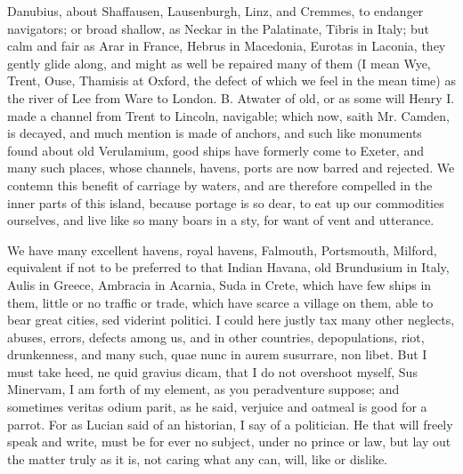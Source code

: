 {Danubius, about Shaffausen, Lausenburgh, Linz, and Cremmes, to endanger
navigators; or broad shallow, as Neckar in the Palatinate, Tibris in
Italy; but calm and fair as Arar in France, Hebrus in Macedonia,
Eurotas in Laconia, they gently glide along, and might as well be
repaired many of them (I mean Wye, Trent, Ouse, Thamisis at Oxford, the
defect of which we feel in the mean time) as the river of Lee from Ware
to London. B. Atwater of old, or as some will Henry I. made a
channel from Trent to Lincoln, navigable; which now, saith Mr. Camden,
is decayed, and much mention is made of anchors, and such like
monuments found about old Verulamium, good ships have formerly
come to Exeter, and many such places, whose channels, havens, ports are
now barred and rejected. We contemn this benefit of carriage by waters,
and are therefore compelled in the inner parts of this island, because
portage is so dear, to eat up our commodities ourselves, and live like
so many boars in a sty, for want of vent and utterance.

We have many excellent havens, royal havens, Falmouth, Portsmouth,
Milford, \etc{} equivalent if not to be preferred to that Indian Havana,
old Brundusium in Italy, Aulis in Greece, Ambracia in Acarnia, Suda in
Crete, which have few ships in them, little or no traffic or trade,
which have scarce a village on them, able to bear great cities, sed
viderint politici. I could here justly tax many other neglects, abuses,
errors, defects among us, and in other countries, depopulations, riot,
drunkenness, \etc{} and many such, quae nunc in aurem susurrare, non
libet. But I must take heed, ne quid gravius dicam, that I do not
overshoot myself, Sus Minervam, I am forth of my element, as you
peradventure suppose; and sometimes veritas odium parit, as he said,
verjuice and oatmeal is good for a parrot. For as Lucian said of an
historian, I say of a politician. He that will freely speak and write,
must be for ever no subject, under no prince or law, but lay out the
matter truly as it is, not caring what any can, will, like or dislike.

}
